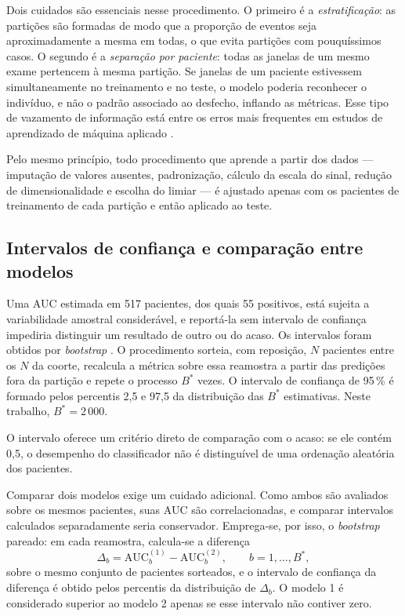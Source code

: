 Dois cuidados são essenciais nesse procedimento. O primeiro é a
\textit{estratificação}: as partições são formadas de modo que a proporção de
eventos seja aproximadamente a mesma em todas, o que evita partições com
pouquíssimos casos. O segundo é a \textit{separação por paciente}: todas as
janelas de um mesmo exame pertencem à mesma partição. Se janelas de um
paciente estivessem simultaneamente no treinamento e no teste, o modelo
poderia reconhecer o indivíduo, e não o padrão associado ao desfecho,
inflando as métricas. Esse tipo de vazamento de informação está entre os
erros mais frequentes em estudos de aprendizado de máquina aplicado
\cite{kapoor2023leakage}.

Pelo mesmo princípio, todo procedimento que aprende a partir dos dados ---
imputação de valores ausentes, padronização, cálculo da escala do sinal,
redução de dimensionalidade e escolha do limiar --- é ajustado apenas com os
pacientes de treinamento de cada partição e então aplicado ao teste.

\subsection{Intervalos de confiança e comparação entre modelos}
\label{subsec:fund-bootstrap}

Uma \gls{AUC} estimada em 517 pacientes, dos quais 55 positivos, está sujeita
a variabilidade amostral considerável, e reportá-la sem intervalo de
confiança impediria distinguir um resultado de outro ou do acaso. Os
intervalos foram obtidos por \textit{bootstrap} \cite{efron1993introduction}.
O procedimento sorteia, com reposição, $N$ pacientes entre os $N$ da coorte,
recalcula a métrica sobre essa reamostra a partir das predições fora da
partição e repete o processo $B^{*}$ vezes. O intervalo de confiança de 95\,\%
é formado pelos percentis 2,5 e 97,5 da distribuição das $B^{*}$ estimativas.
Neste trabalho, $B^{*} = 2\,000$.

O intervalo oferece um critério direto de comparação com o acaso: se ele
contém 0,5, o desempenho do classificador não é distinguível de uma
ordenação aleatória dos pacientes.

Comparar dois modelos exige um cuidado adicional. Como ambos são avaliados
sobre os mesmos pacientes, suas \gls{AUC} são correlacionadas, e comparar
intervalos calculados separadamente seria conservador. Emprega-se, por isso,
o \textit{bootstrap} pareado: em cada reamostra, calcula-se a diferença
\begin{equation}
	\Delta_b = \mathrm{AUC}_b^{(1)} - \mathrm{AUC}_b^{(2)}, \qquad b = 1, \dots, B^{*},
	\label{eq:delta-auc}
\end{equation}
\noindent
sobre o mesmo conjunto de pacientes sorteados, e o intervalo de confiança da
diferença é obtido pelos percentis da distribuição de $\Delta_b$. O modelo
1 é considerado superior ao modelo 2 apenas se esse intervalo não contiver zero.




